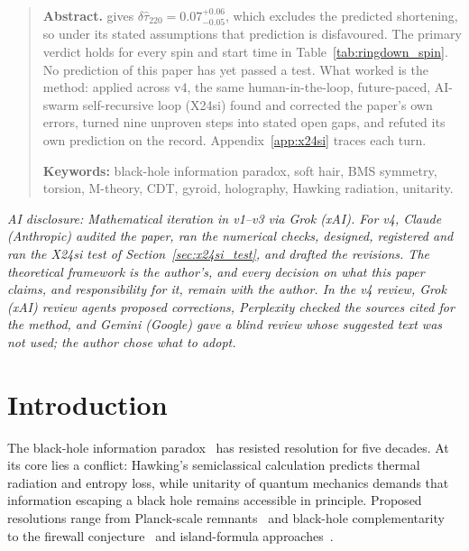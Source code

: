 \documentclass[11pt,a4paper]{article}
\renewenvironment{abstract}{%
  \begin{quote}\small\textbf{Abstract.}\quad\ignorespaces}%
  {\end{quote}}
\begin{document}
\begin{abstract}
gives $\delta\hat\tau_{220} = 0.07^{+0.06}_{-0.05}$, which excludes the predicted
shortening, so under its stated assumptions that prediction is disfavoured. The primary verdict holds for every spin and start time in Table~\ref{tab:ringdown_spin}.
No prediction of this paper has yet passed a test. What worked is the method: applied
across v4, the same human-in-the-loop, future-paced, AI-swarm self-recursive loop (X24si)
found and corrected the paper's own errors, turned nine unproven steps into stated open
gaps, and refuted its own prediction on the record. Appendix~\ref{app:x24si} traces
each turn.

\smallskip
\noindent\textbf{Keywords:} black-hole information paradox, soft hair, BMS symmetry,
torsion, M-theory, CDT, gyroid, holography, Hawking radiation, unitarity.
\end{abstract}

{\small\textit{AI disclosure: Mathematical iteration in v1--v3 via Grok (xAI). For v4,
Claude (Anthropic) audited the paper, ran the numerical checks, designed, registered and
ran the X24si test of Section~\ref{sec:x24si_test}, and drafted the revisions. The
theoretical framework is the author's, and every decision on what this paper claims, and
responsibility for it, remain with the author. In the v4 review, Grok (xAI) review agents proposed corrections, Perplexity checked the sources cited for the method, and Gemini (Google) gave a blind review whose suggested text was not used; the author chose what to adopt.}}

\vspace{8pt}

\section{Introduction}
\label{sec:intro}

The black-hole information paradox~\cite{Hawking1975} has resisted resolution for
five decades.  At its core lies a conflict: Hawking's semiclassical calculation
predicts thermal radiation and entropy loss, while unitarity of quantum mechanics
demands that information escaping a black hole remains accessible in principle.
Proposed resolutions range from Planck-scale remnants~\cite{AharonovEtal1987} and
black-hole complementarity~\cite{Susskind1993} to the firewall
conjecture~\cite{AMPS2013} and island-formula approaches~\cite{Penington2020}.
\end{document}
